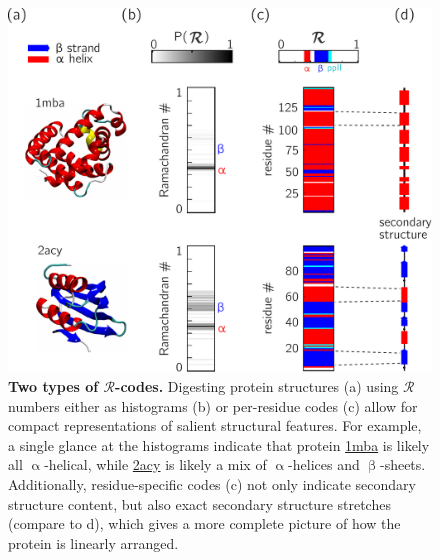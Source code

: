 \documentclass[fleqn,10pt,lineno]{wlpeerj} %
\newcommand{\n}[1]{{\color{red}#1}}
\begin{document}
\begin{figure}[t!]
\centering
\includegraphics[width=0.65\linewidth]{figures/fig2_metrics.pdf}
\caption{\textbf{Two types of $\mathcal{R}$-codes.} Digesting protein structures (a) using $\mathcal{R}$ numbers either as histograms (b) or per-residue codes (c) allow for compact representations of salient structural features. For example, a single glance at the histograms indicate that protein \href{https://www.rcsb.org/structure/1MBA}{1mba} is likely all $\upalpha$-helical, while \href{https://www.rcsb.org/structure/2ACY}{2acy} is likely a mix of $\upalpha$-helices and $\upbeta$-sheets. Additionally, residue-specific codes (c) not only indicate secondary structure content, but also exact \n{secondary} structure stretches (compare to d), which gives a more complete picture of how the protein is linearly arranged. \label{fig:simple_stacks}} 
\end{figure}

\end{document}
